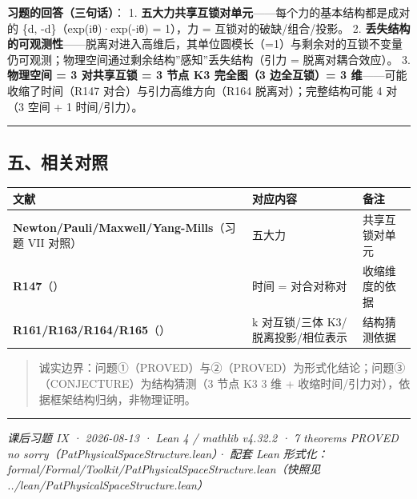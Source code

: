 \documentclass[
]{article}
\newcounter{none} %
\begin{document}
\textbf{习题的回答（三句话）}： 1.
\textbf{五大力共享互锁对单元}------每个力的基本结构都是成对的 \{d,
-d\}（exp(iθ)·exp(-iθ) = 1），力 = 互锁对的破缺/组合/投影。 2.
\textbf{丢失结构的可观测性}------脱离对进入高维后，其单位圆模长（=1）与剩余对的互锁不变量仍可观测；物理空间通过剩余结构''感知''丢失结构（引力
= 脱离对耦合效应）。 3. \textbf{物理空间 = 3 对共享互锁 = 3 节点 K3
完全图（3 边全互锁）= 3 维}------可能收缩了时间（R147
对合）与引力高维方向（R164 脱离对）；完整结构可能 4 对（3 空间 + 1
时间/引力）。

\begin{center}\rule{0.5\linewidth}{0.5pt}\end{center}

\subsection{五、相关对照}\label{ux4e94ux76f8ux5173ux5bf9ux7167}

{\def\LTcaptype{none} %
\begin{longtable}[]{@{}
 >{\raggedright\arraybackslash}p{}
 >{\raggedright\arraybackslash}p{}
 >{\raggedright\arraybackslash}p{}@{}}
\toprule\noalign{}
\begin{minipage}[b]{\linewidth}\raggedright
文献
\end{minipage} & \begin{minipage}[b]{\linewidth}\raggedright
对应内容
\end{minipage} & \begin{minipage}[b]{\linewidth}\raggedright
备注
\end{minipage} \\
\midrule\noalign{}
\endhead
\bottomrule\noalign{}
\endlastfoot
\textbf{Newton/Pauli/Maxwell/Yang-Mills}（习题 VII 对照） & 五大力 &
共享互锁对单元 \\
\textbf{R147}（） & 时间 = 对合对称对 & 收缩维度的依据 \\
\textbf{R161/R163/R164/R165}（） & k 对互锁/三体
K3/脱离投影/相位表示 & 结构猜测依据 \\
\end{longtable}
}

\begin{quote}
诚实边界：问题①（PROVED）与②（PROVED）为形式化结论；问题③（CONJECTURE）为结构猜测（3
节点 K3 3 维 + 收缩时间/引力对），依据框架结构归纳，非物理证明。
\end{quote}

\begin{center}\rule{0.5\linewidth}{0.5pt}\end{center}

\emph{课后习题 IX · 2026-08-13 · Lean 4 / mathlib v4.32.2 · 7
theorems PROVED no sorry（PatPhysicalSpaceStructure.lean）· 配套 Lean
形式化：formal/Formal/Toolkit/PatPhysicalSpaceStructure.lean（快照见
../lean/PatPhysicalSpaceStructure.lean）}
\end{document}
